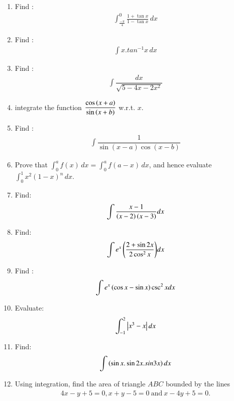 \begin{enumerate}
\item Find :
	\begin{align*}
		\int_{\frac{-\pi}{4}}^{0}\frac{1+\tan x}{1-\tan x}\,dx
	\end{align*}
 \item Find :
	\begin{align*}
		\int x.tan^{-1}x\,dx
	\end{align*}
 \item Find : 
	\begin{align*}
		\int \dfrac{dx}{\sqrt{5-4x-2x^2}}
	\end{align*}
 \item integrate the function 
	$\dfrac{\cos\left(x+a\right)}{\sin\left(x+b\right)}$  w.r.t. $x$.
 \item Find :                                                        
           \begin{align}                                                     
              \int\dfrac{1}{\sin(x-a)\cos(x-b)}                       
           \end{align}
\item Prove that $\int_{0}^{a}f(x)\,dx=\int_{0}^{a}f(a-x)\,dx$, and hence evaluate $\int_{0}^{1}x^{2}(1-x)^{n}\,dx.$


\item Find:
    \begin{align*}
		\int\frac{x-1}{\left(x-2\right)\left(x-3\right)}dx
    \end{align*}

\item Find:
	\begin{align*}
		\int {e^x\ensuremath{\left(\dfrac{2+\sin 2x}{2 \cos^2 x}\right)}} dx
	\end{align*}

\item  Find :
    \begin{align*}
        \int {e}^x\left(\cos x - \sin x\right)\csc^2 x dx
    \end{align*}

\item Evaluate:
  \begin{align*}
    \int_{-1}^{2} \begin{vmatrix}x^{3}-x\end{vmatrix}{dx}
  \end{align*}
  
\item Find:
    \begin{align*}
    \int \left(\sin x.\sin 2x. sin 3x\right)dx
    \end{align*}

\item Using integration, find the area of triangle $ABC$ bounded by the lines 
   \begin{align*}
        4x-y+5=0, x+y-5=0~\text{and}~x-4y+5=0.
    \end{align*}


\end{enumerate}
